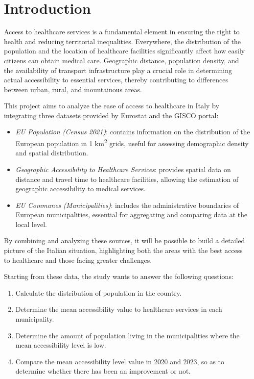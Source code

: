 \section{Introduction}

Access to healthcare services is a fundamental element in ensuring the right to health and reducing territorial inequalities. 
Everywhere, the distribution of the population and the location of healthcare facilities significantly affect how easily citizens can obtain medical care.
Geographic distance, population density, and the availability of transport infrastructure play a crucial role in determining actual accessibility to essential services, thereby contributing to differences between urban, rural, and mountainous areas.

This project aims to analyze the ease of access to healthcare in Italy by integrating three datasets provided by Eurostat and the GISCO portal:

\begin{itemize}
	
	\item \emph{EU Population (Census 2021)}: contains information on the distribution of the European population in 1 km\textsuperscript{2} grids, useful for assessing demographic density and spatial distribution.

	\item \emph{Geographic Accessibility to Healthcare Services}: provides spatial data on distance and travel time to healthcare facilities, allowing the estimation of geographic accessibility to medical services.

	\item \emph{EU Communes (Municipalities)}: includes the administrative boundaries of European municipalities, essential for aggregating and comparing data at the local level.
\end{itemize}

By combining and analyzing these sources, it will be possible to build a detailed picture of the Italian situation, highlighting both the areas with the best access to healthcare and those facing greater challenges.

Starting from these data, the study wants to answer the following questions:
\begin{enumerate}
	\item Calculate the distribution of population in the country.
	\item Determine the mean accessibility value to healthcare services in each municipality.
	\item Determine the amount of population living in the municipalities where the mean accessibility level is low.
	\item Compare the mean accessibility level value in 2020 and 2023, so as to determine whether there has been an improvement or not.
\end{enumerate}

